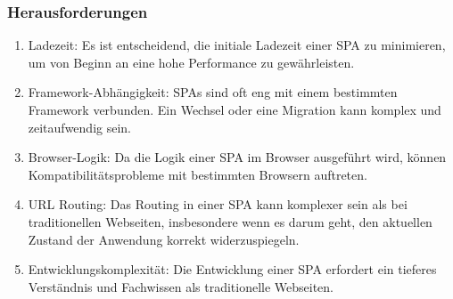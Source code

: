 \subsubsection{Herausforderungen}
\begin{enumerate}
    \item Ladezeit: Es ist entscheidend, die initiale Ladezeit einer \ac{SPA} zu minimieren, um von Beginn an eine hohe Performance zu gewährleisten.
    \item Framework-Abhängigkeit: \ac{SPA}s sind oft eng mit einem bestimmten Framework verbunden. Ein Wechsel oder eine Migration kann komplex und zeitaufwendig sein.
    \item Browser-Logik: Da die Logik einer \ac{SPA} im Browser ausgeführt wird, können Kompatibilitätsprobleme mit bestimmten Browsern auftreten.
    \item \ac{URL} Routing: Das Routing in einer \ac{SPA} kann komplexer sein als bei traditionellen Webseiten, insbesondere wenn es darum geht, den aktuellen Zustand der Anwendung korrekt widerzuspiegeln.
    \item Entwicklungskomplexität: Die Entwicklung einer \ac{SPA} erfordert ein tieferes Verständnis und Fachwissen als traditionelle Webseiten.
\end{enumerate}


